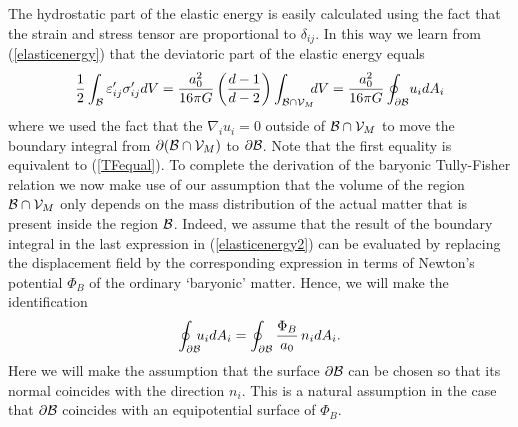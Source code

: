 \documentclass[a4paper,12pt]{article}
\begin{document}
The hydrostatic part of the elastic energy is easily calculated using the fact that the strain and stress tensor are proportional to $\delta_{ij}$. In this way we learn from (\ref{elasticenergy}) that the deviatoric part of the elastic energy equals
\begin{equation}
\label{elasticenergy2}
{1\over 2}\int_{{\cal B}} \varepsilon'_{ij}\sigma'_{ij} dV	 = {a_0^2\over 16\pi G}  \left({d-1\over d-2}\right)   \int_{{\cal B}\cap {\cal V}_M} \!\!\!dV = {a_0^2\over 16\pi G}  \oint_{\partial{\cal B}}\! u_i dA_i	%
\end{equation}
where we used the fact that the $\nabla_iu_i=0$ outside of ${\cal B}\cap {\cal V}_M$ to move the boundary integral from 
$\partial({\cal B}\cap {\cal V}_M)$ to $\partial{\cal B}$. 
Note that the first equality is equivalent to (\ref{TFequal}).  
To complete the derivation of the baryonic Tully-Fisher relation we now make use of our assumption  that the volume of the region ${\cal B}\cap {\cal V}_M$ only depends on the mass distribution of the actual matter that is present inside the region $\cal B$.  Indeed, we assume that the result of the boundary integral in the last expression in (\ref{elasticenergy2}) can be evaluated by replacing the displacement field by the corresponding expression in terms of Newton's potential $\Phi_B$ of the ordinary `baryonic' matter. Hence, we will make the  identification
\begin{equation}
\label{identify}
\oint_{\partial {\cal B}}  \!\!\! u_i dA_i	= 	\oint_{\partial {\cal B}}   {\Phi_B \over a_0} \,  n_i dA_i .
\end{equation}
Here we will make the assumption that the surface $\partial {\cal B}$ can be chosen so that its normal coincides with the direction $n_i$.
This is a natural assumption in the case that $\partial {\cal B}$ coincides with an equipotential surface of $\Phi_B$. 
 
\end{document}
